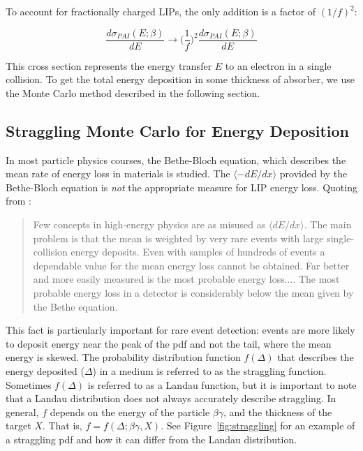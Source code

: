 To account for fractionally charged \ac{LIP}s, the only addition is a factor of $(1/f)^{2}$:

\begin{equation}
\frac{d\sigma_{PAI}(E; \beta)}{dE} \longrightarrow \Big(\frac{1}{f}\Big)^{2} \frac{d\sigma_{PAI}(E; \beta)}{dE}
\end{equation}

This cross section represents the energy transfer $E$ to an electron in a single collision. To get the total energy deposition in some thickness of absorber, we use the Monte Carlo method described in the following section.

\subsection{Straggling Monte Carlo for Energy Deposition}
In most particle physics courses, the Bethe-Bloch equation, which describes the mean rate of energy loss in materials is studied. The $\langle - dE/dx \rangle$ provided by the Bethe-Bloch equation is \textit{not} the appropriate measure for \ac{LIP} energy loss. Quoting from \cite{PDG}:

\begin{quote}
Few concepts in high-energy physics are as misused as $\langle dE/dx \rangle$. The main problem is that the mean is weighted by very rare events with large single-collision energy deposits. Even with samples of hundreds of events a dependable value for the mean energy loss cannot be obtained. Far better and more easily measured is the most probable energy loss.... The most probable energy loss in a detector is considerably below the mean given by the Bethe equation.
\end{quote}

This fact is particularly important for rare event detection: events are more likely to deposit energy near the peak of the \ac{pdf} and not the tail, where the mean energy is skewed. The probability distribution function $f(\Delta)$ that describes the energy deposited ($\Delta$) in a medium is referred to as the straggling function. Sometimes $f(\Delta)$ is referred to as a Landau function, but it is important to note that a Landau distribution does not always accurately describe straggling. In general, $f$ depends on the energy of the particle $\beta \gamma$, and the thickness of the target $X$. That is,  $f = f(\Delta; \beta \gamma, X)$. See Figure~\ref{fig:straggling} for an example of a straggling \ac{pdf} and how it can differ from the Landau distribution.

